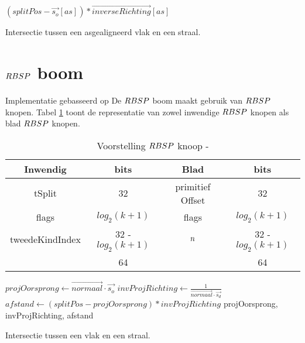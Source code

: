     \begin{dutchalgorithm}
        \begin{algorithmic}       
                \State \Return $(splitPos - \vec{s_o}[as]) * \vec{inverseRichting}[as]$
            \EndFunction
        \end{algorithmic}
        \caption{Intersectie tussen een asgealigneerd vlak en een straal.}
    \end{dutchalgorithm}


\section{$\symRBSP$ boom}
\label{sec:h4-rbsp}
Implementatie gebasseerd op
De $\symRBSP$ boom maakt gebruik van $\symRBSP$ knopen. 
Tabel \ref{tab:voorstelling-rbsp-knoop} toont de representatie van zowel inwendige $\symRBSP$ knopen als blad $\symRBSP$ knopen.
\begin{table}
        \centering
        \begin{tabular}{@{}|c|c|c|c|@{}} \toprule      
        Inwendig & bits & Blad & bits \\ \midrule
        tSplit & 32 & primitief Offset & 32 \\
        flags  & $log_2(k + 1)$  &  flags   & $log_2(k + 1)$   \\
        tweedeKindIndex & 32 - $log_2(k + 1)$ & $n$ & 32 - $log_2(k + 1)$ \\ \hline \hline
        & 64 & & 64    \\ \bottomrule
        \end{tabular}
    \caption[Voorstelling $\symRBSP$ knoop]{Voorstelling $\symRBSP$ knoop - \small }
    \label{tab:voorstelling-rbsp-knoop}    
\end{table}   

\begin{dutchalgorithm}
    \begin{algorithmic}       
            \State $projOorsprong \gets \vec{normaal} \cdot \vec{s_o}$
            \State $invProjRichting \gets \frac{1}{\vec{normaal} \cdot \vec{s_d}}$
            \State $afstand \gets (splitPos - projOorsprong) * invProjRichting $
            \State \Return projOorsprong, invProjRichting, afstand
        \EndFunction
    \end{algorithmic}
    \caption{Intersectie tussen een vlak en een straal.}
\end{dutchalgorithm}

